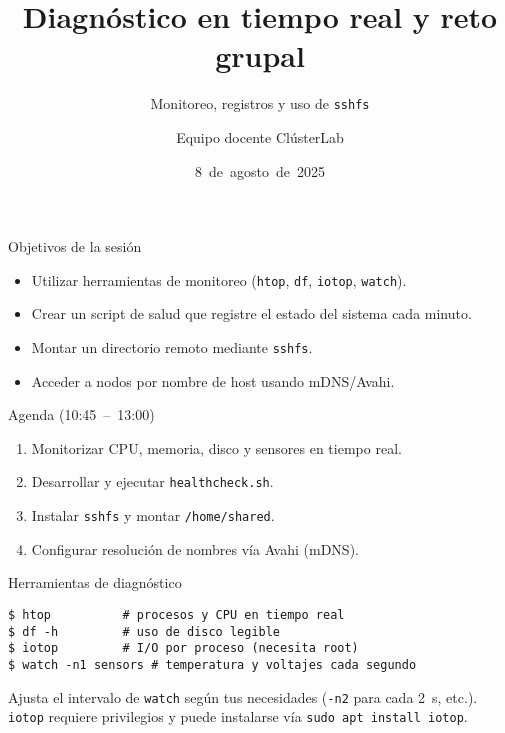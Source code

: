 \documentclass[aspectratio=169,professionalfonts]{beamer}
\title[ClústerLab • Día 3]{Diagnóstico en tiempo real y reto grupal}
\subtitle{Monitoreo, registros y uso de \texttt{sshfs}}
\author{Equipo docente ClústerLab}
\date{8 de agosto de 2025}
\begin{document}
\begin{frame}[plain]
  \titlepage
\end{frame}

\begin{frame}[fragile]{Objetivos de la sesión}
  \begin{itemize}
    \item Utilizar herramientas de monitoreo (\texttt{htop}, \texttt{df}, \texttt{iotop}, \texttt{watch}).
    \item Crear un script de salud que registre el estado del sistema cada minuto.
    \item Montar un directorio remoto mediante \texttt{sshfs}.
    \item Acceder a nodos por nombre de host usando mDNS/Avahi.
  \end{itemize}
\end{frame}

\begin{frame}[fragile]{Agenda (10:45 – 13:00)}
  \begin{enumerate}
    \item Monitorizar CPU, memoria, disco y sensores en tiempo real.
    \item Desarrollar y ejecutar \texttt{healthcheck.sh}.
    \item Instalar \texttt{sshfs} y montar \texttt{/home/shared}.
    \item Configurar resolución de nombres vía Avahi (mDNS).
  \end{enumerate}
\end{frame}

\begin{frame}[fragile]{Herramientas de diagnóstico}
  \begin{verbatim}
$ htop          # procesos y CPU en tiempo real
$ df -h         # uso de disco legible
$ iotop         # I/O por proceso (necesita root)
$ watch -n1 sensors # temperatura y voltajes cada segundo
  \end{verbatim}
  \begin{infobox}
  Ajusta el intervalo de \texttt{watch} según tus necesidades (\texttt{-n2} para cada 2 s, etc.). \texttt{iotop} requiere privilegios y puede instalarse vía \texttt{sudo apt install iotop}.
  \end{infobox}
\end{frame}
\end{document}
